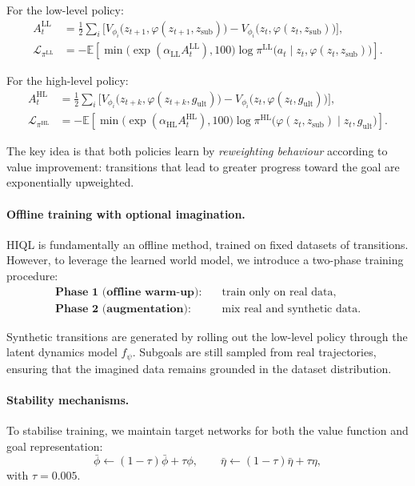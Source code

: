 For the low-level policy:
\begin{align}
A^{\mathrm{LL}}_t &=
\frac{1}{2}\sum_i \Big[
V_{\phi_i}\!\big(z_{t+1}, \varphi(z_{t+1}, z_{\mathrm{sub}})\big)
- V_{\phi_i}\!\big(z_t, \varphi(z_t, z_{\mathrm{sub}})\big)
\Big], \\
\mathcal{L}_{\pi^{\mathrm{LL}}} &=
-\mathbb{E}\!\left[
\min\big(\exp(\alpha_{\mathrm{LL}} A^{\mathrm{LL}}_t), 100\big)
\log \pi^{\mathrm{LL}}\!\big(a_t \mid z_t, \varphi(z_t, z_{\mathrm{sub}})\big)
\right].
\end{align}

For the high-level policy:
\begin{align}
A^{\mathrm{HL}}_t &=
\frac{1}{2}\sum_i \Big[
V_{\phi_i}\!\big(z_{t+k}, \varphi(z_{t+k}, g_{\mathrm{ult}})\big)
- V_{\phi_i}\!\big(z_t, \varphi(z_t, g_{\mathrm{ult}})\big)
\Big], \\
\mathcal{L}_{\pi^{\mathrm{HL}}} &=
-\mathbb{E}\!\left[
\min\big(\exp(\alpha_{\mathrm{HL}} A^{\mathrm{HL}}_t), 100\big)
\log \pi^{\mathrm{HL}}\!\big(\varphi(z_t, z_{\mathrm{sub}}) \mid z_t, g_{\mathrm{ult}}\big)
\right].
\end{align}

The key idea is that both policies learn by \emph{reweighting behaviour}
according to value improvement: transitions that lead to greater progress
toward the goal are exponentially upweighted.

\paragraph{Offline training with optional imagination.}
HIQL is fundamentally an offline method, trained on fixed datasets of
transitions. However, to leverage the learned world model, we introduce a
two-phase training procedure:
\begin{align}
\textbf{Phase 1 (offline warm-up):} &\quad \text{train only on real data}, \\
\textbf{Phase 2 (augmentation):} &\quad \text{mix real and synthetic data}.
\end{align}

Synthetic transitions are generated by rolling out the low-level policy
through the latent dynamics model $f_\psi$. Subgoals are still sampled
from real trajectories, ensuring that the imagined data remains grounded
in the dataset distribution.

\paragraph{Stability mechanisms.}
To stabilise training, we maintain target networks for both the value
function and goal representation:
\[
\bar\phi \leftarrow (1 - \tau)\bar\phi + \tau \phi, \qquad
\bar\eta \leftarrow (1 - \tau)\bar\eta + \tau \eta,
\]
with $\tau = 0.005$.

